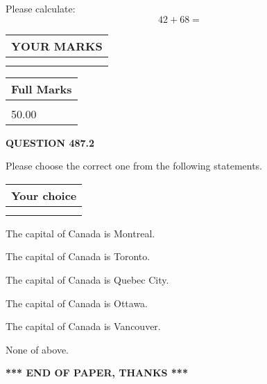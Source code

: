 \documentclass[12pt]{article}
\begin{document}
  
 
Please calculate:
\begin{equation}
42 +  %
68 = \nonumber
\end{equation}
 

 

 
  
\vspace{0.2in}
  
\noindent\begin{tabular}{|l|}
\hline
 YOUR MARKS  \\
\hline
 \\ 
 \\ 
\hline
\end{tabular}
\hspace{0.05in} \begin{tabular}{|l|}
\hline
 Full Marks  \\
\hline
 \\ 
50.00 \\
\hline
\end{tabular}
{\textbf{\Large{QUESTION
487.2 
}}}
  
  
Please choose the correct one from the following statements.
  
  
\noindent\hspace{3.0in} \begin{tabular}{|l|}
\hline
Your choice \\
\hline
 \\ 
 \\ 
\hline
\end{tabular}
  
  
 
 
The capital of Canada is Montreal.
 
 
The capital of Canada is Toronto.
 
 
The capital of Canada is Quebec City.
 
 
The capital of Canada is Ottawa.
 
 
The capital of Canada is Vancouver.
 
 
 None of above.
 
 
   
   
 \vspace{0.2in}
 
   
   
   
   
\vspace{1.0in} 
{\textbf{\large{ *** END OF PAPER, THANKS *** }}} 
   
\end{document}
